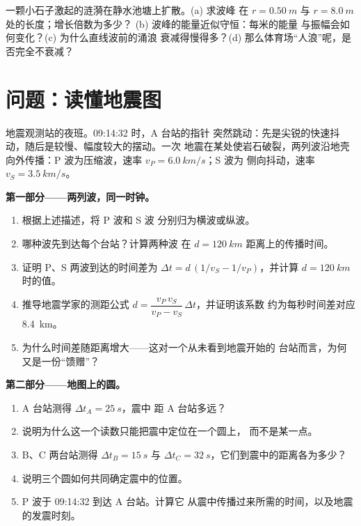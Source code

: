\begin{exercise}[$\star\star\star$]\label{exo:g12:mechanical-waves:15}
一颗小石子激起的涟漪在静水池塘上扩散。(a) 求波峰
在 $r = \qty{0.50}{m}$ 与 $r = \qty{8.0}{m}$ 处的长度；增长倍数为多少？
(b) 波峰的能量近似守恒：每米的能量
与振幅会如何变化？(c) 为什么直线波前的涌浪
衰减得慢得多？(d) 那么体育场“人浪”呢，是否完全不衰减？
\end{exercise}

\section{问题：读懂地震图}

\begin{problem}
\label{pb:g12:mechanical-waves:1}
地震观测站的夜班。09:14:32 时，A 台站的指针
突然跳动：先是尖锐的快速抖动，随后是较慢、幅度较大的摆动。一次
地震在某处使岩石破裂，两列波沿地壳
向外传播：P 波为压缩波，速率 $v_P = \qty{6.0}{km/s}$；S 波为
侧向抖动，速率 $v_S = \qty{3.5}{km/s}$。

\medskip
\noindent\textbf{第一部分——两列波，同一时钟。}
\begin{enumerate}
  \item 根据上述描述，将 P 波和 S 波
        分别归为横波或纵波。
  \item 哪种波先到达每个台站？计算两种波
        在 $d = \qty{120}{km}$ 距离上的传播时间。
  \item 证明 P、S 两波到达的时间差为
        $\Delta t = d\,(1/v_S - 1/v_P)$，并计算
        $d = \qty{120}{km}$ 时的值。
  \item 推导地震学家的测距公式
        $d = \dfrac{v_P\,v_S}{v_P - v_S}\,\Delta t$，并证明该系数
        约为每秒时间差对应 \qty{8.4}{km}。
  \item 为什么时间差随距离增大——这对一个从未看到地震开始的
        台站而言，为何又是一份“馈赠”？
\end{enumerate}

\medskip
\noindent\textbf{第二部分——地图上的圆。}
\begin{enumerate}[resume]
  \item A 台站测得 $\Delta t_A = \qty{25}{s}$，震中
        距 A 台站多远？
  \item 说明为什么这一个读数只能把震中定位在一个圆上，
        而不是某一点。
  \item B、C 两台站测得 $\Delta t_B = \qty{15}{s}$ 与
        $\Delta t_C = \qty{32}{s}$，它们到震中的距离各为多少？
  \item 说明三个圆如何共同确定震中的位置。
  \item P 波于 09:14:32 到达 A 台站。计算它
        从震中传播过来所需的时间，以及地震的发震时刻。
\end{enumerate}


\end{problem}
